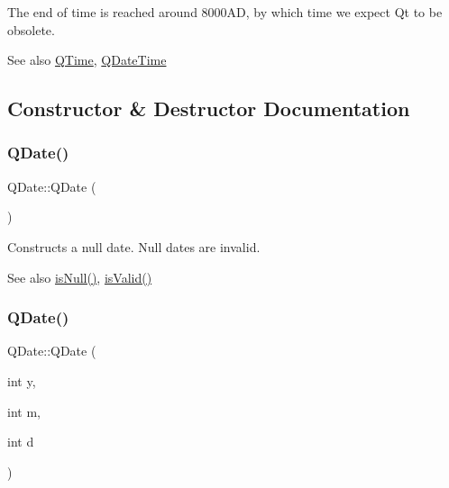 The end of time is reached around 8000AD, by which time we expect Qt to be obsolete.

\begin{DoxySeeAlso}{See also}
\mbox{\hyperlink{class_q_time}{Q\+Time}}, \mbox{\hyperlink{class_q_date_time}{Q\+Date\+Time}} 
\end{DoxySeeAlso}


\subsection{Constructor \& Destructor Documentation}
\mbox{\label{class_q_date_ac553172d4c172c75bb78e9b246eaa0a1}} 
\subsubsection{\texorpdfstring{QDate()}{QDate()}\hspace{0.1cm}{\footnotesize\ttfamily [1/2]}}
{\footnotesize\ttfamily Q\+Date\+::\+Q\+Date (\begin{DoxyParamCaption}{ }\end{DoxyParamCaption})\hspace{0.3cm}{\ttfamily [inline]}}

Constructs a null date. Null dates are invalid.

\begin{DoxySeeAlso}{See also}
\mbox{\hyperlink{class_q_date_a68f2787f407fd6812712b34c11f9bfb8}{is\+Null()}}, \mbox{\hyperlink{class_q_date_a29baa5808185ed5a3ed5a0440e27ca9c}{is\+Valid()}} 
\end{DoxySeeAlso}
\mbox{\label{class_q_date_abaf62f540ece3f5da8a7fa61298c34f3}} 
\subsubsection{\texorpdfstring{QDate()}{QDate()}\hspace{0.1cm}{\footnotesize\ttfamily [2/2]}}
{\footnotesize\ttfamily Q\+Date\+::\+Q\+Date (\begin{DoxyParamCaption}\item[{int}]{y,  }\item[{int}]{m,  }\item[{int}]{d }\end{DoxyParamCaption})}

